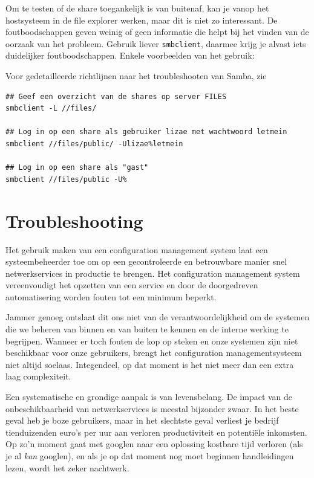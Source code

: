 Om te testen of de share toegankelijk is van buitenaf, kan je vanop het hostsysteem in de file explorer werken, maar dit is niet zo interessant.  De foutboodschappen geven weinig of geen informatie die helpt bij het vinden van de oorzaak van het probleem. Gebruik liever \texttt{smbclient}, daarmee krijg je alvast iets duidelijker foutboodschappen. Enkele voorbeelden van het gebruik:

Voor gedetailleerde richtlijnen naar het troubleshooten van Samba, zie~\textcite{TrigdellEtAl2010,CarterEtAl2010}

\begin{verbatim}
## Geef een overzicht van de shares op server FILES
smbclient -L //files/

## Log in op een share als gebruiker lizae met wachtwoord letmein
smbclient //files/public/ -Ulizae%letmein

## Log in op een share als "gast"
smbclient //files/public -U%
\end{verbatim}

\section{Troubleshooting}
\label{sec:troubleshooting-1}

Het gebruik maken van een configuration management system laat een systeembeheerder toe om op een gecontroleerde en betrouwbare manier snel netwerkservices in productie te brengen. Het configuration management system vereenvoudigt het opzetten van een service en door de doorgedreven automatisering worden fouten tot een minimum beperkt.

Jammer genoeg ontslaat dit ons niet van de verantwoordelijkheid om de systemen die we beheren van binnen en van buiten te kennen en de interne werking te begrijpen. Wanneer er toch fouten de kop op steken en onze systemen zijn niet beschikbaar voor onze gebruikers, brengt het configuration managementsysteem niet altijd soelaas. Integendeel, op dat moment is het niet meer dan een extra laag complexiteit.

Een systematische en grondige aanpak is van levensbelang. De impact van de onbeschikbaarheid van netwerkservices is meestal bijzonder zwaar. In het beste geval heb je boze gebruikers, maar in het slechtste geval verliest je bedrijf tienduizenden euro's per uur aan verloren productiviteit en potentiële inkomsten. Op zo'n moment gaat met googlen naar een oplossing kostbare tijd verloren (als je al \emph{kan} googlen), en als je op dat moment nog moet beginnen handleidingen lezen, wordt het zeker nachtwerk.

